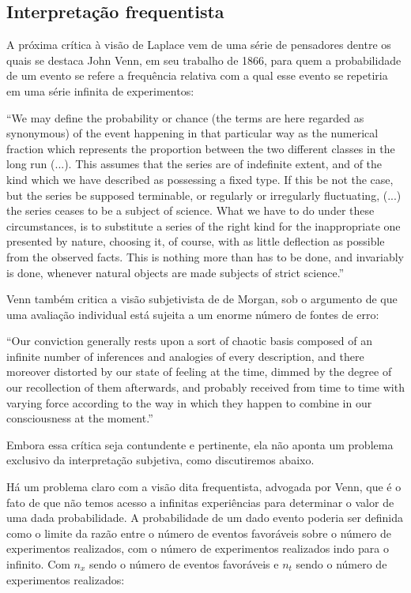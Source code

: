 \documentclass[12pt,a4paper]{article}
\begin{document}
\subsection{Interpretação frequentista}
A próxima crítica à visão de Laplace vem de uma série de pensadores dentre os quais se destaca John Venn, em seu trabalho de 
1866, para quem a probabilidade de um evento se refere a frequência relativa com a qual esse evento se repetiria em uma
série infinita de experimentos:

``We may define the probability or chance (the terms are here regarded as synonymous) of the event happening in that
particular way as the numerical fraction which represents the proportion between the two different classes in the long run (...).
This assumes that the series are of indefinite extent, and of the kind which we have described as possessing a fixed type.
If this be not the case, but the series be supposed terminable, or regularly or irregularly fluctuating, (...) the series ceases
to be a subject of science. What we have to do under these circumstances, is to substitute a series of the right kind for
the inappropriate one presented by nature, choosing it, of course, with as little deflection as possible from the observed facts.
This is nothing more than has to be done, and invariably is done, whenever natural objects are made subjects of strict science.''
\cite{Venn1866}

Venn também critica a visão subjetivista de de Morgan, sob
o argumento de que uma avaliação individual está sujeita a
um enorme número de fontes de erro:

``Our conviction generally rests upon a sort of chaotic basis
composed of an infinite number of inferences and analogies
of every description, and there moreover distorted by our
state of feeling at the time, dimmed by the degree of our
recollection of them afterwards, and probably received
from time to time with varying force according to the way in
which they happen to combine in our consciousness at the 
moment.''\cite{Venn1866}

Embora essa crítica seja contundente e pertinente, ela não aponta um problema exclusivo da interpretação subjetiva, como
discutiremos abaixo.

Há um problema claro com a visão dita frequentista, advogada por Venn, que é o fato de que não temos 
acesso a infinitas experiências para determinar o valor
de uma dada probabilidade. A probabilidade de um dado evento poderia ser definida como o limite da razão entre o número de eventos
favoráveis sobre o número de experimentos realizados, com o número de experimentos realizados indo para o infinito. Com 
$n_x$ sendo o número de eventos favoráveis e $n_t$ sendo o número de experimentos realizados:
\end{document}
